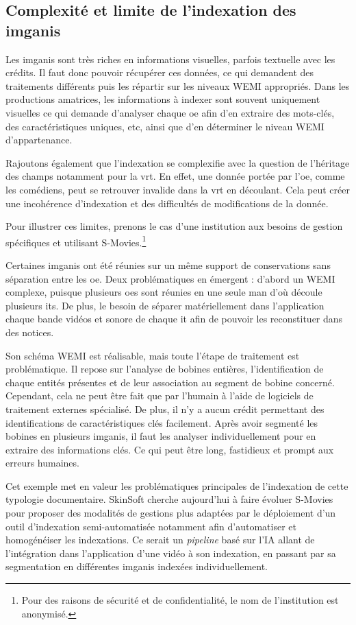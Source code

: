 \subsection{Complexité et limite de l'indexation des \glspl{imgani}}

Les \glspl{imgani} sont très riches en informations visuelles, parfois textuelle avec les crédits. Il faut donc pouvoir récupérer ces données, ce qui demandent des traitements différents puis les répartir sur les niveaux \gls{WEMI} appropriés. Dans les productions amatrices, les informations à indexer sont souvent uniquement visuelles ce qui demande d'analyser chaque \gls{oe} afin d'en extraire des mots-clés, des caractéristiques uniques, etc, ainsi que d'en déterminer le niveau \gls{WEMI} d'appartenance. 

Rajoutons également que l'indexation se complexifie avec la question de l'héritage des champs notamment pour la \gls{vrt}. En effet, une donnée portée par l'\gls{oe}, comme les comédiens, peut se retrouver invalide dans la \gls{vrt} en découlant. Cela peut créer une incohérence d'indexation et des difficultés de modifications de la donnée.\newline

\label{imganiExemple} Pour illustrer ces limites, prenons le cas d'une institution aux besoins de gestion spécifiques et utilisant S-Movies.\footnote{Pour des raisons de sécurité et de confidentialité, le nom de l'institution est anonymisé.} 

Certaines \glspl{imgani} ont été réunies sur un même support de conservations sans séparation entre les \gls{oe}. Deux problématiques en émergent : d'abord un \gls{WEMI} complexe, puisque plusieurs \glspl{oe} sont réunies en une seule \gls{man} d'où découle plusieurs \glspl{it}. De plus, le besoin de séparer matériellement dans l'application chaque bande vidéos et sonore de chaque \gls{it} afin de pouvoir les reconstituer dans des notices. 

Son schéma \gls{WEMI} est réalisable, mais toute l'étape de traitement est problématique. Il repose sur l'analyse de bobines entières, l'identification de chaque entités présentes et de leur association au segment de bobine concerné. Cependant, cela ne peut être fait que par l'humain à l'aide de logiciels de traitement externes spécialisé. De plus, il n'y a aucun crédit permettant des identifications de caractéristiques clés facilement. Après avoir segmenté les bobines en plusieurs \glspl{imgani}, il faut les analyser individuellement pour en extraire des informations clés. Ce qui peut être long, fastidieux et prompt aux erreurs humaines.\newline 

Cet exemple met en valeur les problématiques principales de l'indexation de cette typologie documentaire. SkinSoft cherche aujourd'hui à faire évoluer S-Movies pour proposer des modalités de gestions plus adaptées par le déploiement d'un outil d'indexation semi-automatisée notamment afin d'automatiser et homogénéiser les indexations. Ce serait un \textit{pipeline} basé sur l'\gls{IA} allant de l'intégration dans l'application d'une vidéo à son indexation, en passant par sa segmentation en différentes \glspl{imgani} indexées individuellement.